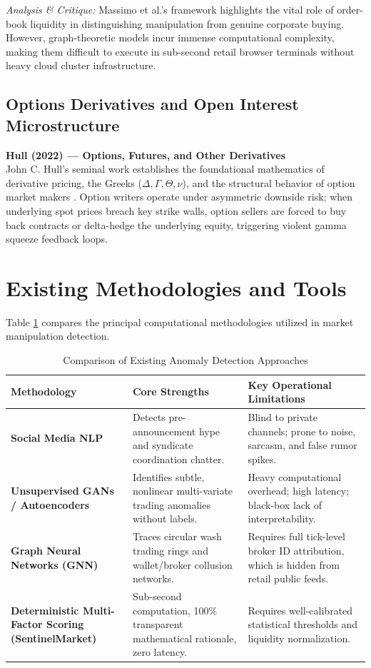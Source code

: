 \textit{Analysis \& Critique:} Massimo et al.'s framework highlights the vital role of order-book liquidity in distinguishing manipulation from genuine corporate buying. However, graph-theoretic models incur immense computational complexity, making them difficult to execute in sub-second retail browser terminals without heavy cloud cluster infrastructure.

\subsection{Options Derivatives and Open Interest Microstructure}
\noindent \textbf{Hull (2022) --- Options, Futures, and Other Derivatives} \\
John C. Hull's seminal work establishes the foundational mathematics of derivative pricing, the Greeks ($\Delta, \Gamma, \Theta, \nu$), and the structural behavior of option market makers \cite{hull2022options}. Option writers operate under asymmetric downside risk; when underlying spot prices breach key strike walls, option sellers are forced to buy back contracts or delta-hedge the underlying equity, triggering violent gamma squeeze feedback loops.

\section{Existing Methodologies and Tools}
Table \ref{tab:ml_methods_comparison} compares the principal computational methodologies utilized in market manipulation detection.

\begin{table}[H]
\centering
\caption{Comparison of Existing Anomaly Detection Approaches}
\label{tab:ml_methods_comparison}
\begin{tabularx}{\textwidth}{@{}p{3.2cm}Xp{4.5cm}@{}}
\toprule
\textbf{Methodology} & \textbf{Core Strengths} & \textbf{Key Operational Limitations} \\
\midrule
\textbf{Social Media NLP} & Detects pre-announcement hype and syndicate coordination chatter. & Blind to private channels; prone to noise, sarcasm, and false rumor spikes. \\
\addlinespace
\textbf{Unsupervised GANs / Autoencoders} & Identifies subtle, nonlinear multi-variate trading anomalies without labels. & Heavy computational overhead; high latency; black-box lack of interpretability. \\
\addlinespace
\textbf{Graph Neural Networks (GNN)} & Traces circular wash trading rings and wallet/broker collusion networks. & Requires full tick-level broker ID attribution, which is hidden from retail public feeds. \\
\addlinespace
\textbf{Deterministic Multi-Factor Scoring (SentinelMarket)} & Sub-second computation, 100\% transparent mathematical rationale, zero latency. & Requires well-calibrated statistical thresholds and liquidity normalization. \\
\bottomrule
\end{tabularx}
\end{table}

